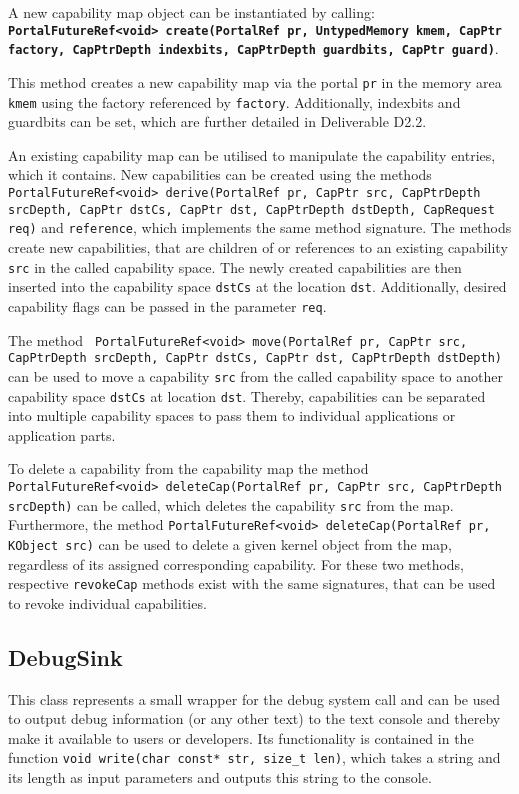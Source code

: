 A new capability map object can be instantiated by calling: \\
\textbf{\texttt{PortalFutureRef<void> create(PortalRef pr, UntypedMemory kmem, CapPtr
factory, CapPtrDepth indexbits, CapPtrDepth guardbits, CapPtr guard)}}. 

This method creates a new capability map via the portal \texttt{pr} in the memory
area \texttt{kmem} using the factory referenced by \texttt{factory}.
Additionally, indexbits and guardbits can be set, which are further detailed in
Deliverable D2.2.

An existing capability map can be utilised to manipulate the capability entries, which it contains. New capabilities can be created using the methods \texttt{PortalFutureRef<void> derive(PortalRef pr, CapPtr src, CapPtrDepth srcDepth, CapPtr dstCs, CapPtr dst, CapPtrDepth dstDepth, CapRequest req)} and \texttt{reference}, which implements the same method signature.  The methods create new capabilities, that are children of or references to an existing capability \texttt{src} in the called capability space. The newly created capabilities are then inserted into the capability space \texttt{dstCs} at the location \texttt{dst}. Additionally, desired capability flags can be passed in the parameter \texttt{req}. 

The method \texttt{ PortalFutureRef<void> move(PortalRef pr, CapPtr src, \\CapPtrDepth srcDepth, CapPtr dstCs, CapPtr dst, CapPtrDepth dstDepth)} can be used to move a capability \texttt{src} from the called capability space to another capability space \texttt{dstCs} at location \texttt{dst}. Thereby, capabilities can be separated into multiple capability spaces to pass them to individual applications or application parts.

To delete a capability from the capability map the method \texttt{PortalFutureRef<void> deleteCap(PortalRef pr, CapPtr src, CapPtrDepth srcDepth)} can be called, which deletes the capability \texttt{src} from the map. Furthermore, the method \texttt{PortalFutureRef<void> deleteCap(PortalRef pr, KObject src)} can be used to delete a given kernel object from the map, regardless of its assigned corresponding capability. For these two methods, respective \texttt{revokeCap} methods exist with the same signatures, that can be used to revoke individual capabilities.

\subsection{DebugSink}
This class represents a small wrapper for the debug system call and can be used
to output debug information (or any other text) to the text console and thereby
make it available to users or developers. Its functionality is contained in the
function \texttt{void write(char const* str, size\_t len)}, which takes a string
and its length as input parameters and outputs this string to the console.

